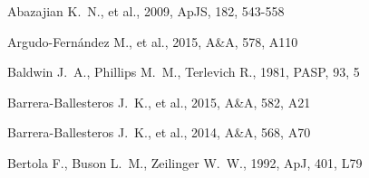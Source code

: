 \documentclass[a4paper,fleqn,usenatbib]{mnras}
\begin{document}
\begin{thebibliography}{}


 Abazajian K.~N., et al., 2009, ApJS, 182, 543-558 

 Argudo-Fern{\'a}ndez M., et al., 2015, A\&A, 578, A110 

 Baldwin J.~A., Phillips M.~M., Terlevich R., 1981, PASP, 93, 5 


 Barrera-Ballesteros J.~K., et al., 2015, A\&A, 582, A21 

 Barrera-Ballesteros J.~K., et al., 2014, A\&A, 568, A70 



 Bertola F., Buson L.~M., Zeilinger W.~W., 1992, ApJ, 401, L79 






\end{thebibliography}
\end{document}
